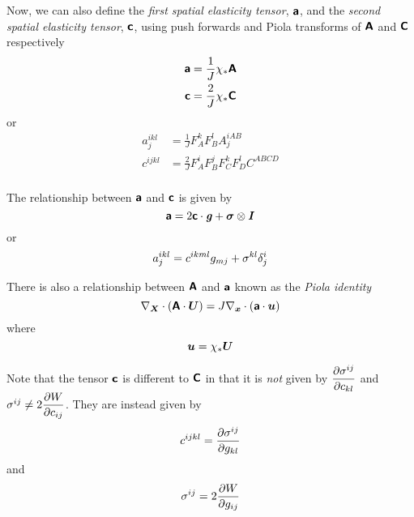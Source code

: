 Now, we can also define the \emph{first spatial elasticity tensor},
$\boldsymbol{\mathsf{a}}$, and the \emph{second spatial elasticity tensor},
$\boldsymbol{\mathsf{c}}$, using push forwards and Piola transforms of $\boldsymbol{\mathsf{A}}$
and $\boldsymbol{\mathsf{C}}$ respectively \ie{}
\begin{equation}
  \begin{split}
    \boldsymbol{\mathsf{a}}&=\frac{1}{J} \chi_{*}\boldsymbol{\mathsf{A}} \\
    \boldsymbol{\mathsf{c}}&=\frac{2}{J} \chi_{*}\boldsymbol{\mathsf{C}} \\
  \end{split}
\end{equation}
or
\begin{equation}
  \begin{split}
    a^{ikl}_{j}&=\frac{1}{J}F^{k}_{A}F^{l}_{B}A^{iAB}_{j} \\
    c^{ijkl}&=\frac{2}{J}F^{i}_{A}F^{j}_{B}F^{k}_{C}F^{l}_{D}C^{ABCD} \\
  \end{split}
\end{equation}

The relationship between $\boldsymbol{\mathsf{a}}$ and $\boldsymbol{\mathsf{c}}$ is given by
\begin{equation}
  \boldsymbol{\mathsf{a}}=2\boldsymbol{\mathsf{c}}\cdot\boldsymbol{\mathit{g}}+ \boldsymbol{\mathit{\sigma}} \otimes \boldsymbol{\mathit{I}} 
\end{equation}
or
\begin{equation}
  a^{ikl}_{j}=c^{ikml}g_{mj}+\sigma^{kl} \delta_{j}^{i} 
\end{equation}

There is also a relationship between $\boldsymbol{\mathsf{A}}$ and $\boldsymbol{\mathsf{a}}$
known as the \emph{Piola identity} \ie
\begin{equation}
  \divergence{\vectr{X}}{\pbrac{\dotprod{\tensorfour{A}}{\vectr{U}}}}=
  J\divergence{\vectr{x}}{\pbrac{\dotprod{\tensorfour{a}}{\vectr{u}}}}
\end{equation}
where
\begin{equation}
  \boldsymbol{u}= \chi_{*}\boldsymbol{U} 
\end{equation}

Note that the tensor $\boldsymbol{\mathsf{c}}$ is different to $\boldsymbol{\mathsf{C}}$ in that
it is \emph{not} given by $ \dfrac{\partial \sigma^{ij}}{\partial c_{kl}} $ and $\sigma^{ij}\neq
2 \dfrac{\partial W}{\partial c_{ij}} $. They are instead given by
\begin{equation}
  c^{ijkl}= \dfrac{\partial \sigma^{ij}}{\partial g_{kl}} 
\end{equation}
and
\begin{equation}
  \sigma^{ij}=2 \dfrac{\partial W}{\partial g_{ij}} 
\end{equation}

